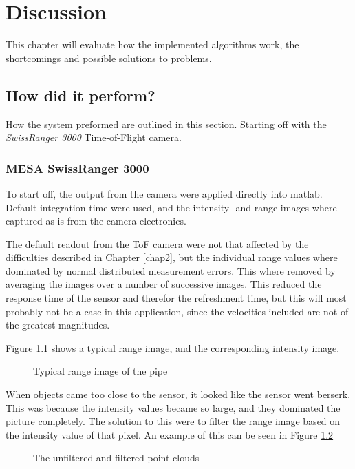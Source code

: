 
\chapter{Discussion}
\label{chap8}
This chapter will evaluate how the implemented algorithms work, the shortcomings and
possible solutions to problems. 

\section{How did it perform?}
How the system preformed are outlined in this section. Starting off with the
\emph{SwissRanger 3000} Time-of-Flight camera.

\subsection{MESA SwissRanger 3000}
To start off, the output from the camera were applied directly into matlab. Default
integration time were used, and the intensity- and range images where captured as is from
the camera electronics.

The default readout from the ToF camera were not that affected by the difficulties
described in Chapter \ref{chap2}, but the individual range values where dominated by normal
distributed measurement errors. This where removed by averaging the images over a number
of successive images. This reduced the response time of the sensor and therefor the
refreshment time, but this will most probably not be a case in this application, since the
velocities included are not of the greatest magnitudes. 

Figure \ref{chap8:fig-typical-tof-image} shows a typical range image, and the
corresponding intensity image. 
\begin{figure}[htbp]
    \centering
    \caption{Typical range image of the pipe}
    \label{chap8:fig-typical-tof-image}
\end{figure}

When objects came too close to the sensor, it looked like the sensor went berserk. This
was because the intensity values became so large, and they dominated the picture
completely. The solution to this were to filter the range image based on the intensity
value of that pixel. An example of this can be seen in Figure
\ref{chap8:fig-tof-imagery-intensity-filtered}
\begin{figure}[htbp]
    \centering
    \caption{The unfiltered and filtered point clouds}
    \label{chap8:fig-tof-imagery-intensity-filtered}
\end{figure}



